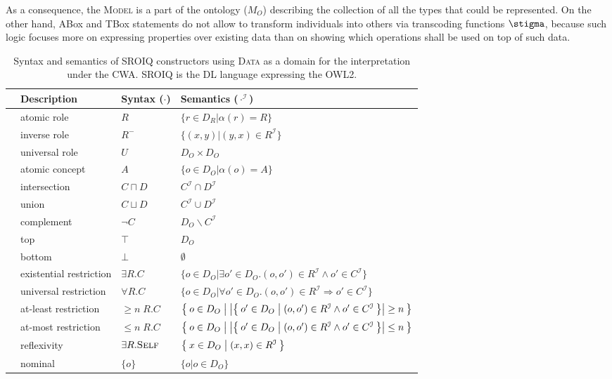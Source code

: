 As a consequence, the \textsc{Model} is a part of the ontology ($M_O$) describing the collection of all the types that could be represented. On the other hand, ABox and TBox statements do not allow to transform individuals into others via transcoding functions $\transcoding$, because such logic focuses more on expressing properties over existing data than on showing which operations shall be used on top of such data.

\begin{table}
\centering
	\begin{tabular}{l|l|ll}
	\toprule
	& Description & Syntax ($\cdot$) & Semantics ($\cdot^{\mathcal{I}}$)\\
	\midrule
\parbox[t]{2mm}{} & atomic role &  $R$ & $\{r\in D_R|\alpha(r)=R\}$ \\
& inverse role & $R^{-}$ & $\{(x,y)|(y,x)\in R^{\mathcal{I}}\}$\\
& universal role & $U$ & 	$D_O\times D_O$\\
\midrule
\parbox[t]{2mm}{} & atomic concept & $A$ & $\{o\in D_O| \alpha(o)=A\}$\\
& intersection &	$C\sqcap D$ & $C^{\mathcal{I}}\cap D^{\mathcal{I}}$\\
& union &	$C\sqcup D$ & $C^{\mathcal{I}}\cup D^{\mathcal{I}}$\\
& complement &	$\neg C$ & $D_O\backslash C^{\mathcal{I}}$\\
& top & $\top$ & $D_O$\\
& bottom & $\bot$ & $\emptyset$ \\
& existential restriction 	& $\exists R. C$ & $\{o\in D_O|  \exists o'\in D_O. (o,o')\in R^{\mathcal{I}} \wedge o'\in C^{\mathcal{I}}\}$ 	\\
& universal restriction 	& $\forall R. C$ & $\{o\in D_O|  \forall o'\in D_O. (o,o')\in R^{\mathcal{I}} \Rightarrow o'\in C^{\mathcal{I}}\}$ 	\\
& at-least restriction & $\geq n\; R.C$ & $\Set{o\in D_O|\left|\Set{o'\in D_O|(o,o')\in R^{\mathcal{I}}\wedge o'\in C^{\mathcal{I}}}\right|\geq n }$ \\
& at-most restriction & $\leq n\; R.C$ & $\Set{o\in D_O|\left|\Set{o'\in D_O|(o,o')\in R^{\mathcal{I}}\wedge o'\in C^{\mathcal{I}}}\right|\leq n }$ \\
& reflexivity & $\exists R. \textsc{Self}$ & $\Set{x\in D_O| (x,x)\in R^{\mathcal{I}}}$\\
& nominal & $\{o\}$ & $\{o|o\in D_O\}$\\
\bottomrule
	\end{tabular}
	\caption{Syntax and semantics of SROIQ constructors using \textsc{Data} as a domain for the interpretation under the CWA. SROIQ is the DL language expressing the OWL2.}
	\label{tab:SROIQ}
	\end{table}


